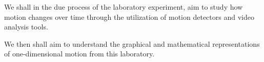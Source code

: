 {We shall in the due process of the laboratory experiment, aim to study how motion changes over time through the utilization of motion detectors and video analysis tools.}

{We then shall aim to understand the graphical and mathematical representations of one-dimensional motion from this laboratory.}

{}


